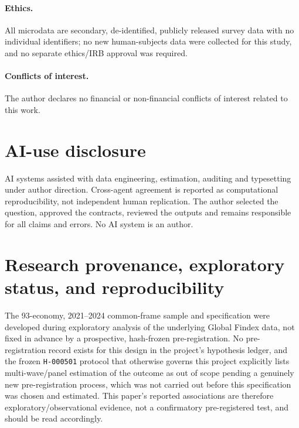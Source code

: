\paragraph{Ethics.} All microdata are secondary, de-identified, publicly released survey
data with no individual identifiers; no new human-subjects data were collected for this
study, and no separate ethics/IRB approval was required.

\paragraph{Conflicts of interest.} The author declares no financial or non-financial
conflicts of interest related to this work.

\section*{AI-use disclosure}

AI systems assisted with data engineering, estimation, auditing and typesetting under
author direction. Cross-agent agreement is reported as computational reproducibility, not
independent human replication. The author selected the question, approved the contracts,
reviewed the outputs and remains responsible for all claims and errors. No AI system is an
author.

\section*{Research provenance, exploratory status, and reproducibility}

The 93-economy, 2021--2024 common-frame sample and specification were developed during
exploratory analysis of the underlying Global Findex data, not fixed in advance by a
prospective, hash-frozen pre-registration. No pre-registration record exists for this
design in the project's hypothesis ledger, and the frozen \texttt{H-000501} protocol that
otherwise governs this project explicitly lists multi-wave/panel estimation of the outcome
as out of scope pending a genuinely new pre-registration process, which was not carried
out before this specification was chosen and estimated. This paper's reported associations
are therefore exploratory/observational evidence, not a confirmatory pre-registered test,
and should be read accordingly.

